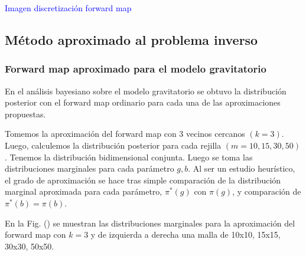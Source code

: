 





\textcolor{blue}{Imagen discretización forward map}



\subsection{Método aproximado al problema inverso}
\subsubsection{Forward map aproximado para el modelo gravitatorio}

En el análisis bayesiano sobre el modelo gravitatorio se obtuvo la distribución posterior con el forward map ordinario para cada una de las aproximaciones propuestas. 

Tomemos la aproximación del forward map con 3 vecinos cercanos $(k= 3)$. Luego, calculemos la distribución posterior para cada rejilla $(m = 10, 15, 30, 50)$. Tenemos la distribución bidimensional conjunta. Luego se toma las distribuciones marginales para cada parámetro $g,b$. Al ser un estudio heurístico, el grado de aproximación se hace tras simple comparación de la distribución marginal aproximada  para cada parámetro, $\pi^{*}(g)$ con $\pi(g)$, y comparación de $\pi^{*}(b) = \pi(b)$.


En la Fig. () se muestran las distribuciones marginales para la aproximación del forward map con $k = 3$ y de izquierda a derecha una malla de 10x10, 15x15, 30x30, 50x50.

